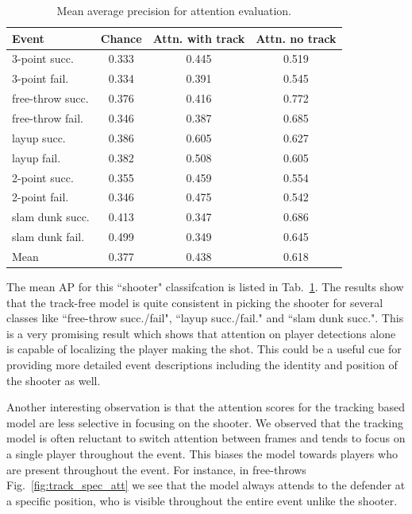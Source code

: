 \begin{table}[ht!]
\begin{center}
\small
 \begin{tabular}{|l|c|c|c|}
  \hline
Event            & Chance & Attn. with track & Attn. no track \\ \hline \hline
3-point succ.    & 0.333 & 0.445 & 0.519 \\ 
3-point fail.    & 0.334 & 0.391 & 0.545 \\ 
free-throw succ. & 0.376 & 0.416 & 0.772 \\ 
free-throw fail. & 0.346 & 0.387 & 0.685 \\  
layup succ.      & 0.386 & 0.605 & 0.627 \\ 
layup fail.      & 0.382 & 0.508 & 0.605 \\ 
2-point succ.    & 0.355 & 0.459 & 0.554 \\ 
2-point fail.    & 0.346 & 0.475 & 0.542 \\ 
slam dunk succ.  & 0.413 & 0.347 & 0.686 \\ 
slam dunk fail.  & 0.499 & 0.349 & 0.645 \\ \hline \hline  
Mean             & 0.377 & 0.438 & 0.618 \\ \hline
  \end{tabular}
\end{center}
  \caption{Mean average precision for attention evaluation.}
  \label{tab:attention_res}
\end{table}

The mean AP for this ``shooter"  classifcation is listed
in Tab.~\ref{tab:attention_res}.
The results show that the track-free model is quite consistent in picking
the shooter for several classes like ``free-throw succ./fail",
``layup succ./fail." and ``slam dunk succ.". This is a very
promising result which shows that attention on player detections
alone is capable of localizing the player making the shot. This could be
a useful cue for providing more detailed event descriptions
including the identity and position of the shooter as well.

Another interesting observation
is that the
attention scores for the tracking based model are less selective in focusing on
the shooter.  We observed that the tracking model is often reluctant to switch
attention between frames and tends to focus on a single player throughout the
event. This biases the model towards players who are present throughout the
event. For instance, in free-throws Fig.~\ref{fig:track_spec_att} we see that
the model always attends to the defender at a specific position, who is visible
throughout the entire event unlike the shooter.


